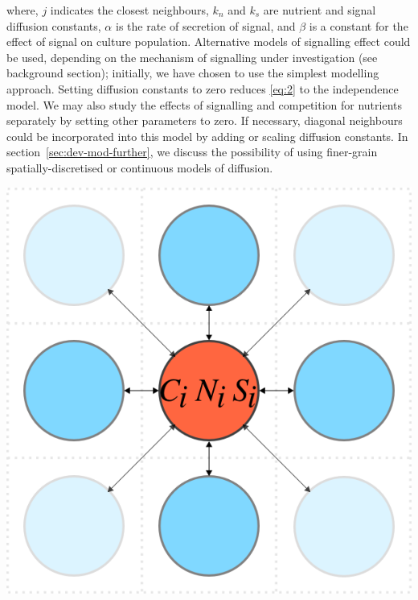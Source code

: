 where, \(j\) indicates the closest neighbours, \(k_{n}\) and \(k_{s}\) are nutrient and signal diffusion constants, \(\alpha\) is the rate of secretion of signal, and \(\beta\) is a constant for the effect of signal on culture population. Alternative models of signalling effect could be used, depending on the mechanism of signalling under investigation (see background section); initially, we have chosen to use the simplest modelling approach. Setting diffusion constants to zero reduces \ref{eq:2} to the independence model. We may also study the effects of signalling and competition for nutrients separately by setting other parameters to zero. If necessary, diagonal neighbours could be incorporated into this model by adding or scaling diffusion constants. In section~\ref{sec:dev-mod-further}, we discuss the possibility of using finer-grain spatially-discretised or continuous models of diffusion.

\begin{Figure}
  \centering
  \includegraphics[width=\linewidth]{square_array}
  \label{fig:simple_model}
\end{Figure}


